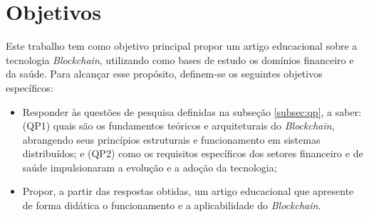 \section{Objetivos}
\label{sec:objetivos}

Este trabalho tem como objetivo principal propor um artigo educacional sobre a tecnologia \textit{Blockchain}, utilizando como bases de estudo os domínios financeiro e da saúde. Para alcançar esse propósito, definem-se os seguintes objetivos específicos:

\begin{itemize}
	\item Responder às questões de pesquisa definidas na subseção \ref{subsec:qp}, a saber: (QP1) quais são os fundamentos teóricos e arquiteturais do \textit{Blockchain}, abrangendo seus princípios estruturais e funcionamento em sistemas distribuídos; e (QP2) como os requisitos específicos dos setores financeiro e de saúde impulsionaram a evolução e a adoção da tecnologia;
	\item Propor, a partir das respostas obtidas, um artigo educacional que apresente de forma didática o funcionamento e a aplicabilidade do \textit{Blockchain}.
\end{itemize}
